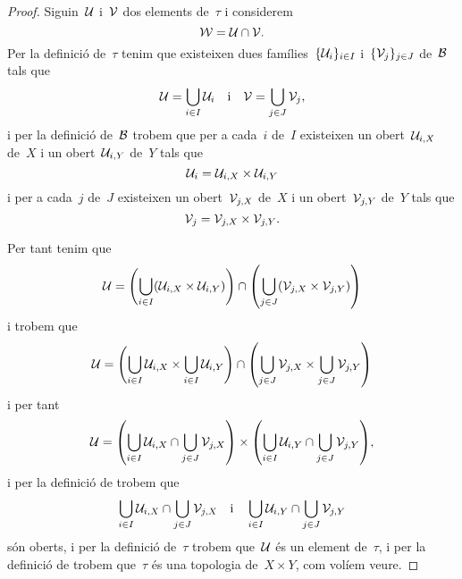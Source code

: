 \documentclass[../../main.tex]{subfiles}
\begin{document}
\begin{proposition}
\begin{proof}
            Siguin~\(\mathcal{U}\) i~\(\mathcal{V}\) dos elements de~\(\tau\) i considerem
            \[
                \mathcal{W}=\mathcal{U}\cap\mathcal{V}.
            \]
            Per la definició de~\(\tau\) tenim que existeixen dues famílies~\(\{\mathcal{U}_{i}\}_{i\in I}\) i~\(\{\mathcal{V}_{j}\}_{j\in J}\) de~\(\mathcal{B}\) tals que
            \[
                \mathcal{U}=\bigcup_{i\in I}\mathcal{U}_{i}\quad\text{i}\quad\mathcal{V}=\bigcup_{j\in J}\mathcal{V}_{j},
            \]
            i per la definició de~\(\mathcal{B}\) trobem que per a cada~\(i\) de~\(I\) existeixen un obert~\(\mathcal{U}_{i,X}\) de~\(X\) i un obert~\(\mathcal{U}_{i,Y}\) de~\(Y\) tals que
            \[
                \mathcal{U}_{i}=\mathcal{U}_{i,X}\times\mathcal{U}_{i,Y}
            \]
            i per a cada~\(j\) de~\(J\) existeixen un obert~\(\mathcal{V}_{j,X}\) de~\(X\) i un obert~\(\mathcal{V}_{j,Y}\) de~\(Y\) tals que
            \[
                \mathcal{V}_{j}=\mathcal{V}_{j,X}\times\mathcal{V}_{j,Y}.
            \]

            Per tant tenim que
            \[
                \obert{U}=\left(\bigcup_{i\in I}\left(\obert{U}_{i,X}\times\obert{U}_{i,Y}\right)\right)\cap\left(\bigcup_{j\in J}\left(\obert{V}_{j,X}\times\obert{V}_{j,Y}\right)\right)
            \]
            i trobem que
            \[
                \obert{U}=\left(\bigcup_{i\in I}\obert{U}_{i,X}\times\bigcup_{i\in I}\obert{U}_{i,Y}\right)\cap\left(\bigcup_{j\in J}\obert{V}_{j,X}\times\bigcup_{j\in J}\obert{V}_{j,Y}\right)
            \]
            i per tant
            \[
                \obert{U}=\left(\bigcup_{i\in I}\obert{U}_{i,X}\cap\bigcup_{j\in J}\obert{V}_{j,X}\right)\times\left(\bigcup_{i\in I}\obert{U}_{i,Y}\cap\bigcup_{j\in J}\obert{V}_{j,Y}\right),
            \]
            i per la definició de  trobem que
            \[
                \bigcup_{i\in I}\mathcal{U}_{i,X}\cap\bigcup_{j\in J}\mathcal{V}_{j,X}\quad\text{i}\quad\bigcup_{i\in I}\mathcal{U}_{i,Y}\cap\bigcup_{j\in J}\mathcal{V}_{j,Y}
            \]
            són oberts, i per la definició de~\(\tau\) trobem que~\(\mathcal{U}\) és un element de~\(\tau\), i per la definició de  trobem que~\(\tau\) és una topologia de~\(X\times Y\), com volíem veure.
        \end{proof}
    \end{proposition}
\end{document}
